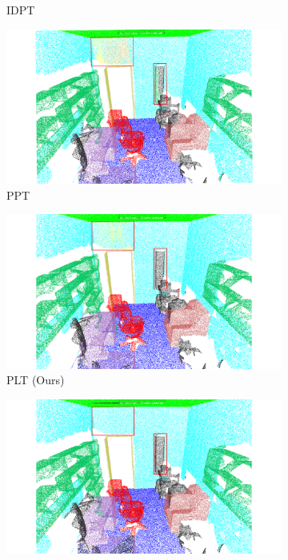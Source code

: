 \begin{figure}
\begin{subfigure}{0.235\textwidth}
        \caption{IDPT~\cite{zha2023instance}}
        \label{fig:s3dis3}
    \end{subfigure}
    \hfill
    \begin{subfigure}{0.235\textwidth}
        \centering
        \includegraphics[width=\linewidth]{fig/S3DIS/PPT.pdf}
        \caption{PPT~\cite{zhang2024positional}}
        \label{fig:s3dis4}
    \end{subfigure}
    \hfill
    \begin{subfigure}{0.235\textwidth}
        \centering
        \includegraphics[width=\linewidth]{fig/S3DIS/PLT.pdf}
        \caption{PLT (Ours)}
        \label{fig:s3dis5}
    \end{subfigure}
    \hfill
    \begin{subfigure}{0.235\textwidth}
        \centering
        \includegraphics[width=\linewidth]{fig/S3DIS/GT.pdf}

\end{subfigure}
\end{figure}
